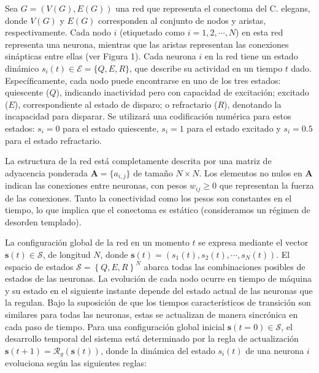 \begin{definitionT}
		
Sea $G=(V(G), E(G))$ una red  que  representa el conectoma del C. elegans, donde $V(G)$ y $E(G)$ corresponden al conjunto de nodos y aristas, respectivamente. Cada nodo $i$ (etiquetado como $i = 1, 2, \cdots, N$) en esta red representa una neurona, mientras que las aristas representan las conexiones sinápticas entre ellas (ver Figura 1). Cada neurona $i$ en la red tiene un estado dinámico $s_i(t) \in \mathcal{E} = \{Q, E, R\}$, que describe su actividad en un tiempo $t$ dado.  Específicamente, cada nodo puede encontrarse en uno de los tres estados: quiescente ($Q$), indicando inactividad pero con capacidad de excitación; excitado ($E$), correspondiente al estado de disparo; o refractario ($R$), denotando la incapacidad para disparar.  Se utilizará  una codificación numérica para estos estados: $s_i = 0$ para el estado quiescente, $s_i = 1$ para el estado excitado y $s_i = 0.5$ para el estado refractario.
	
La estructura de la red está completamente descrita por una matriz de adyacencia ponderada $\bm{A} = \{a_{i,j}\}$ de tamaño $N\times N$.  Los elementos no nulos en $\bm{A}$ indican las conexiones entre neuronas, con pesos $w_{ij} \geq 0$ que representan la fuerza de las conexiones. Tanto la conectividad como los pesos son constantes en el tiempo, lo que implica que el conectoma es estático (consideramos un régimen de desorden templado).
	
	
La configuración global de la red en un momento $t$ se expresa mediante el vector $\mathbf{s}(t)\in\mathcal{S}$, de longitud $N$, donde $\mathbf{s}(t) = (s_1(t), s_2(t), \cdots, s_N(t))$. El espacio de estados $\mathcal{S} = \left\{Q,E,R\right\}^N$ abarca todas las combinaciones posibles de estados de las neuronas. La evolución de cada nodo ocurre en tiempo de máquina y su estado en el siguiente instante depende del estado actual de las neuronas que la regulan. Bajo la suposición de que los tiempos característicos de transición son similares para todas las neuronas, estas se actualizan de manera sincrónica en cada paso de tiempo.  Para una configuración global inicial $\mathbf{s}(t = 0) \in \mathcal{S}$, el desarrollo temporal del sistema está determinado por la regla de actualización $\mathbf{s}(t + 1) = \mathcal{R}_g(\mathbf{s}(t))$, donde la dinámica del estado $s_i(t)$ de una neurona $i$ evoluciona según las siguientes reglas:
	

\end{definitionT}
